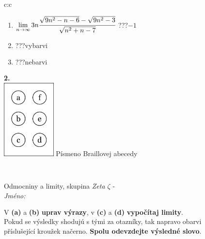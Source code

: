 \documentclass[10pt]{report}
\begin{document}
\begin{tabular}{c:c}
\begin{minipage}[c][104.5mm][t]{0.5\linewidth}
\begin{center}
\begin{minipage}{0.79\linewidth}
\begin{center}
\begin{varwidth}{\linewidth}
\begin{enumerate}
\item $\lim\limits_{n\to\infty}3n\cfrac{\sqrt{9n^2-n-6}-\sqrt{9n^2-3}}{\sqrt{n^2+n-7}}$\quad \dotfill\; ???\;\dotfill \quad $-1$
\item \quad \dotfill\; ???\;\dotfill \quad vybarvi
\item \quad \dotfill\; ???\;\dotfill \quad nebarvi
\end{enumerate}
\end{varwidth}
\end{center}
\end{minipage}
\begin{minipage}{0.20\linewidth}
\begin{center}
{\Huge\bfseries 2.} \\[2mm]
\includegraphics[height=40mm]{../images/braille.png}
{\small Písmeno Braillovej abecedy}
\end{center}
\end{minipage}
\end{center}
\end{minipage}
\\ \hdashline
\begin{minipage}[c][104.5mm][t]{0.5\linewidth}
\begin{center}
\vspace{7mm}
{\huge Odmocniny a limity, skupina \textit{Zeta $\zeta$} -}\\[5mm]
\textit{Jméno:}\phantom{xxxxxxxxxxxxxxxxxxxxxxxxxxxxxxxxxxxxxxxxxxxxxxxxxxxxxxxxxxxxxxxxx}\\[5mm]
\begin{minipage}{0.95\linewidth}
\begin{center}
V \textbf{(a)} a \textbf{(b)} \textbf{uprav výrazy}, v \textbf{(c)} a \textbf{(d)} \textbf{vypočítaj limity}.\\Pokud se výsledky shodujú s tými za otazníky, tak napravo obarvi\\příslušející kroužek načerno. \textbf{Spolu odevzdejte výsledné slovo}.
\end{center}
\end{minipage}
\\[1mm]

\end{center}
\end{minipage}
\end{tabular}
\end{document}
